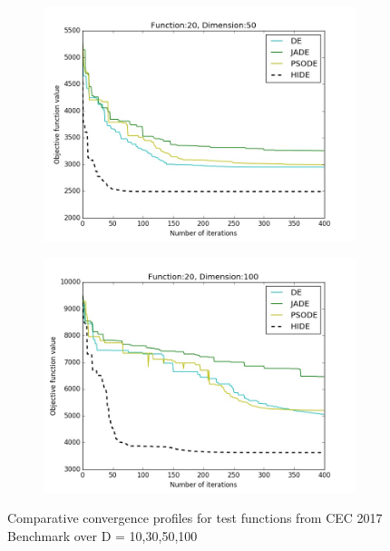 \documentclass[a4paper,twoside]{article}
\begin{document}
\begin{figure}[t!]
\begin{subfigure}[b]{0.24\textwidth}
        \includegraphics[width=\textwidth,natwidth=800,natheight=600]{plot_50D_F20_save}
        \caption{}
    \end{subfigure}
    \begin{subfigure}[b]{0.24\textwidth}
        \includegraphics[width=\textwidth,natwidth=800,natheight=600]{plot_100D_F20_save}
        \caption{}
    \end{subfigure}

    \caption{Comparative convergence profiles for test functions from CEC 2017 Benchmark over D = 10,30,50,100}
    \vspace{-4mm}
\end{figure}
\end{document}
